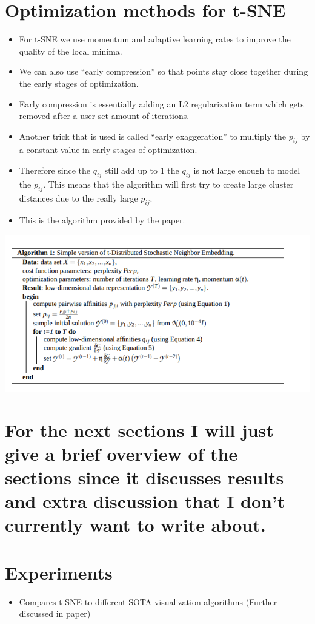 \documentclass[11pt]{article}
\begin{document}
\section{Optimization methods for t-SNE}
\label{sec:org85c5112}
\begin{itemize}
\item For t-SNE we use momentum and adaptive learning rates to improve the quality of the local minima.
\item We can also use ``early compression'' so that points stay close together during the early stages of optimization.
\item Early compression is essentially adding an L2 regularization term which gets removed after a user set amount of iterations.
\item Another trick that is used is called ``early exaggeration'' to multiply the \(p_{ij}\) by a constant value in early stages of optimization.
\item Therefore since the \(q_{ij}\) still add up to 1 the \(q_{ij}\) is not large enough to model the \(p_{ij}\). This means that the algorithm will first try to create large cluster distances due to the really large \(p_{ij}\).
\item This is the algorithm provided by the paper.
\end{itemize}
\begin{center}
\includegraphics[width=.9\linewidth]{./images/tsne_algo.png}
\end{center}

\section{For the next sections I will just give a brief overview of the sections since it discusses results and extra discussion that I don't currently want to write about.}
\label{sec:org93594f5}

\section{Experiments}
\label{sec:org679687d}
\begin{itemize}
\item Compares t-SNE to different SOTA visualization algorithms (Further discussed in paper)
\end{itemize}
\end{document}
